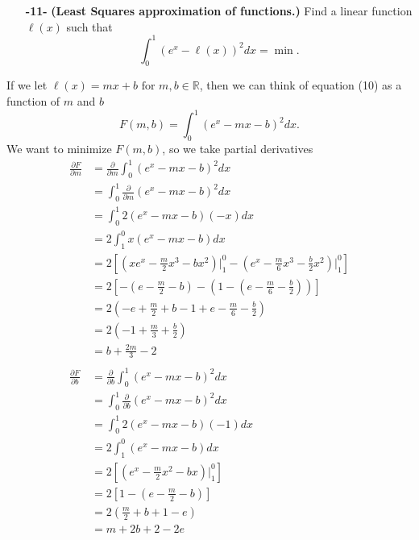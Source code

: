 \documentclass[11pt]{article}
\theoremstyle{definition}
\newcommand{\R}{\mathbb{R}}
\newcommand{\1}[1]{\mathbf{1} \left \{ #1 \right \}}
\begin{document}
\begin{itemize}
    \item[{\textbf{-11-}}] \textbf{(Least Squares approximation of functions.)}  Find a linear function $\ell(x)$ such that
    \begin{equation}
        \int_0^1 (e^x - \ell(x))^2 dx = \min.
    \end{equation}
\end{itemize}
If we let \(\ell(x) = mx+b \text{ for } m,b \in \R\), then we can think of equation (10) as a function of $m$ and $b$
\[F(m,b) = \int_0^1 (e^x - mx - b)^2 dx.\]
We want to minimize $F(m,b)$, so we take partial derivatives
\begin{equation*}
    \begin{split}
        \frac{\partial F}{\partial m} &= \frac{\partial}{\partial m} \int_0^1 (e^x - mx - b)^2 dx \\
        &= \int_0^1 \frac{\partial}{\partial m} (e^x - mx - b)^2 dx \\
        &= \int_0^1 2(e^x - mx - b)(-x)dx \\
        &= 2 \int_1^0 x(e^x - mx - b) dx \\
        &= 2 \left[\left(xe^x - \frac{m}{2}x^3 - bx^2\right) \Big|_1^0 -\left(e^x - \frac{m}{6}x^3 - \frac{b}{2}x^2\right)\Big|_1^0 \right] \\
        &= 2\left[-\left(e - \frac{m}{2} - b\right) - \left(1 - \left(e - \frac{m}{6} - \frac{b}{2}\right)\right)\right] \\
        &= 2\left(-e + \frac{m}{2} + b - 1 + e - \frac{m}{6} - \frac{b}{2}\right) \\
        &= 2\left(-1 + \frac{m}{3} + \frac{b}{2}\right) \\
        &= b + \frac{2m}{3} - 2 \\ \\
        \frac{\partial F}{\partial b} &= \frac{\partial}{\partial b} \int_0^1 (e^x - mx - b)^2 dx \\
        &= \int_0^1 \frac{\partial}{\partial b} (e^x - mx - b)^2 dx \\
        &= \int_0^1 2(e^x - mx - b)(-1)dx \\
        &= 2 \int_1^0 (e^x - mx - b) dx \\
        &= 2 \left[\left(e^x - \frac{m}{2}x^2 - bx\right) \Big|_1^0 \right] \\
        &= 2\left[1 - \left(e - \frac{m}{2} - b\right)\right] \\
        &= 2\left(\frac{m}{2} + b + 1 - e\right) \\
        &= m + 2b + 2 - 2e
    \end{split}
\end{equation*}
\end{document}
